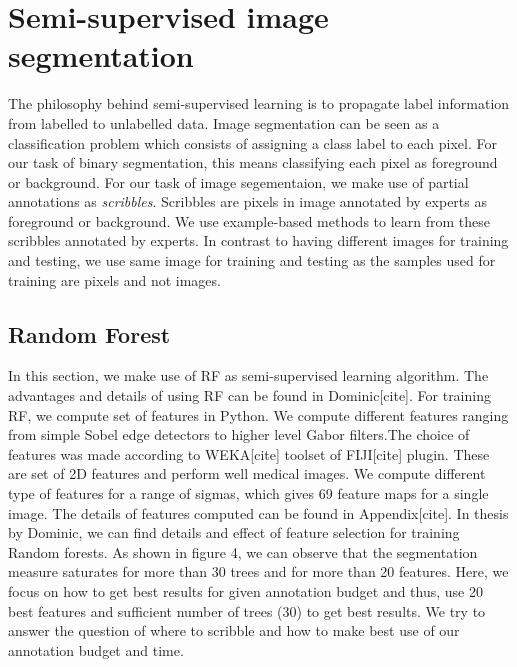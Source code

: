 %
\newpage
\chapter{Semi-supervised image segmentation}
The philosophy behind semi-supervised learning is to propagate label information from labelled to unlabelled data. Image segmentation can be seen as a classification problem which consists of assigning a class label to each pixel. For our task of binary segmentation, this means classifying each pixel as foreground or background. For our task of image segementaion, we make use of partial annotations as \textit{scribbles}. Scribbles are pixels in image annotated by experts as foreground or background. We use example-based methods to learn from these scribbles annotated by experts. In contrast to having different images for training and testing, we use same image for training and testing as the samples used for training are pixels and not images.

\section{Random Forest}
In this section, we make use of RF as semi-supervised learning algorithm. The advantages and details of using RF can be found in Dominic[cite]. For training RF, we compute set  of features in Python. We compute different features ranging from simple Sobel edge detectors to higher level Gabor filters.The choice of features was made according to WEKA[cite] toolset of FIJI[cite] plugin. These are set of 2D features and perform well medical images. We compute different type of features for a range of sigmas, which gives 69 feature maps for a single image. The details of features computed can be found in Appendix[cite]. In thesis by Dominic, we can find details and effect of feature selection for training Random forests. As shown in figure 4, we can observe that the segmentation measure saturates for more than 30 trees and for more than 20 features. Here, we focus on how to get best results for given annotation budget and thus, use 20 best features and sufficient number of trees (30) to get best results. We try to answer the question of where to scribble and how to make best use of our annotation budget and time.

